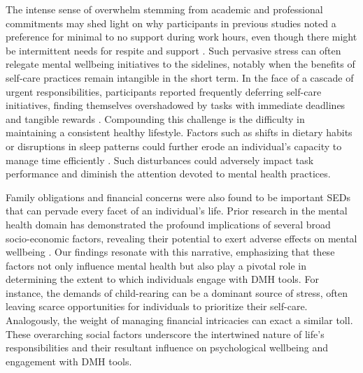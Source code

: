 The intense sense of overwhelm stemming from academic and professional commitments may shed light on why participants in previous studies noted a preference for minimal to no support during work hours, even though there might be intermittent needs for respite and support \cite{bhattacharjee2023investigating, bhattacharjee2022design, howe2022design, wong2023mental}. Such pervasive stress can often relegate mental wellbeing initiatives to the sidelines, notably when the benefits of self-care practices remain intangible in the short term. In the face of a cascade of urgent responsibilities, participants reported frequently deferring self-care initiatives, finding themselves overshadowed by tasks with immediate deadlines and tangible rewards \cite{wong2023mental}. Compounding this challenge is the difficulty in maintaining a consistent healthy lifestyle. Factors such as shifts in dietary habits or disruptions in sleep patterns could further erode an individual's capacity to manage time efficiently \cite{gipson2019effects, karlgren2023sleep, lattie2020designing}. Such disturbances could adversely impact task performance and diminish the attention devoted to mental health practices.

Family obligations and financial concerns were also found to be important SEDs that can pervade every facet of an individual's life.  Prior research in the mental health domain has demonstrated the profound implications of several broad socio-economic factors, revealing their potential to exert adverse effects on mental wellbeing \cite{allen2014social, slavich2020social, tachtler2020supporting, guan2022financial, li2022suffered}. Our findings resonate with this narrative, emphasizing that these factors not only influence mental health but also play a pivotal role in determining the extent to which individuals engage with DMH tools. For instance, the demands of child-rearing can be a dominant source of stress, often leaving scarce opportunities for individuals to prioritize their self-care. Analogously, the weight of managing financial intricacies can exact a similar toll. These overarching social factors underscore the intertwined nature of life's responsibilities and their resultant influence on psychological wellbeing and engagement with DMH tools.



